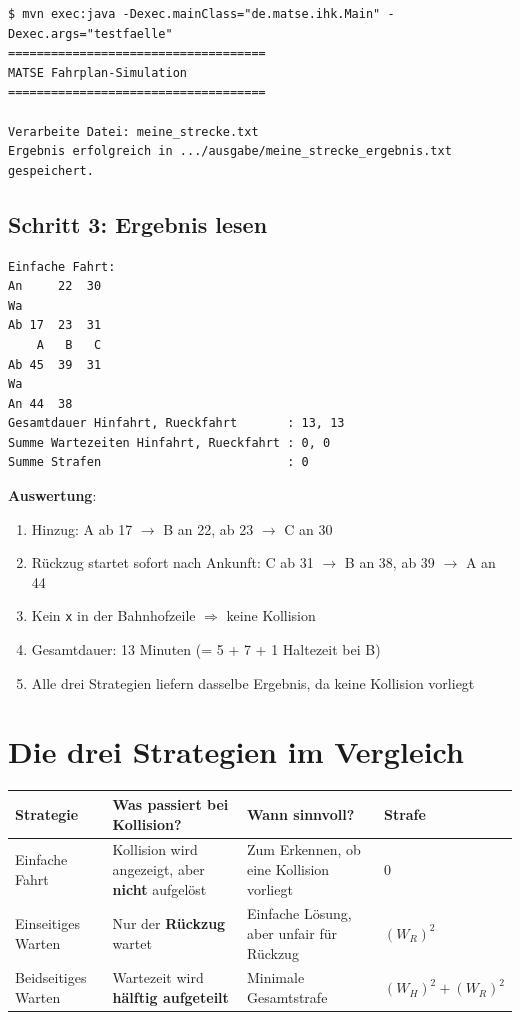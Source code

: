 \documentclass[12pt,a4paper]{article}
\begin{document}
\begin{lstlisting}[style=terminal]
$ mvn exec:java -Dexec.mainClass="de.matse.ihk.Main" -Dexec.args="testfaelle"
====================================
MATSE Fahrplan-Simulation
====================================

Verarbeite Datei: meine_strecke.txt
Ergebnis erfolgreich in .../ausgabe/meine_strecke_ergebnis.txt gespeichert.
\end{lstlisting}

\subsection{Schritt 3: Ergebnis lesen}

\begin{lstlisting}
Einfache Fahrt:
An     22  30
Wa
Ab 17  23  31
    A   B   C
Ab 45  39  31
Wa
An 44  38
Gesamtdauer Hinfahrt, Rueckfahrt       : 13, 13
Summe Wartezeiten Hinfahrt, Rueckfahrt : 0, 0
Summe Strafen                          : 0
\end{lstlisting}

\textbf{Auswertung}:
\begin{enumerate}
    \item Hinzug: A ab 17 $\to$ B an 22, ab 23 $\to$ C an 30
    \item Rückzug startet sofort nach Ankunft: C ab 31 $\to$ B an 38, ab 39 $\to$ A an 44
    \item Kein \texttt{x} in der Bahnhofzeile $\Rightarrow$ keine Kollision
    \item Gesamtdauer: 13 Minuten (= 5 + 7 + 1 Haltezeit bei B)
    \item Alle drei Strategien liefern dasselbe Ergebnis, da keine Kollision vorliegt
\end{enumerate}

\section{Die drei Strategien im Vergleich}

\begin{center}
\begin{tabular}{lp{4cm}p{4.5cm}l}
\toprule
\textbf{Strategie} & \textbf{Was passiert bei Kollision?} & \textbf{Wann sinnvoll?} & \textbf{Strafe} \\
\midrule
Einfache Fahrt & Kollision wird angezeigt, aber \textbf{nicht} aufgelöst & Zum Erkennen, ob eine Kollision vorliegt & 0 \\
Einseitiges Warten & Nur der \textbf{Rückzug} wartet & Einfache Lösung, aber unfair für Rückzug & $(W_R)^2$ \\
Beidseitiges Warten & Wartezeit wird \textbf{hälftig aufgeteilt} & Minimale Gesamtstrafe & $(W_H)^2 + (W_R)^2$ \\
\bottomrule
\end{tabular}
\end{center}
\end{document}

